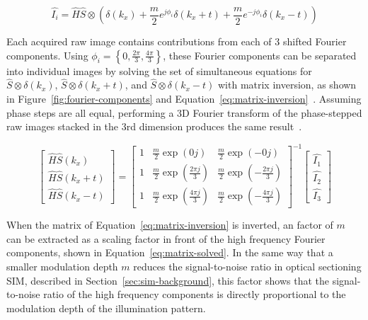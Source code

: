 \begin{equation} \label{eq:heintzmann-fourier}
\hat{I_i} = \hat{H} \hat{S} \otimes \left( \delta \left( k_x \right) + \frac{m}{2} e^{j\phi_i} \delta \left( k_x + t \right) + \frac{m}{2} e^{-j\phi_i} \delta \left( k_x - t \right) \right) 
\end{equation}

Each acquired raw image contains contributions from each of 3 shifted Fourier components. 
Using $\phi_i = \left\lbrace0, \frac{2\pi}{3}, \frac{4\pi}{3}\right\rbrace$, these Fourier components can be separated into individual images by solving the set of simultaneous equations for $\hat{S}\otimes\delta \left( k_x \right)$, $\hat{S}\otimes\delta \left( k_x + t \right)$, and $\hat{S}\otimes\delta \left( k_x - t \right)$ with matrix inversion, as shown in Figure~\ref{fig:fourier-components} and Equation~\ref{eq:matrix-inversion}~\cite{wicker2013phase}. 
Assuming phase steps are all equal, performing a 3D Fourier transform of the phase-stepped raw images stacked in the 3rd dimension produces the same result~\cite{gustafsson2005nonlinear}. 

\begin{equation} \label{eq:matrix-inversion}
\begin{bmatrix} \hat{H}\hat{S}\left(k_x\right) \\ \hat{H}\hat{S}\left(k_x+t\right) \\ \hat{H}\hat{S}\left(k_x-t\right) \end{bmatrix} = 
\begin{bmatrix}
1 & \frac{m}{2}\exp\left(0j\right) & \frac{m}{2}\exp\left(-0j\right) \\ 
1 & \frac{m}{2}\exp\left(\frac{2\pi j}{3}\right) & \frac{m}{2}\exp\left(-\frac{2\pi j}{3}\right) \\ 
1 & \frac{m}{2}\exp\left(\frac{4\pi j}{3}\right) & \frac{m}{2}\exp\left(-\frac{4\pi j}{3}\right)
\end{bmatrix}^{-1}
\begin{bmatrix} \hat{I_1} \\ \hat{I_2} \\ \hat{I_3} \end{bmatrix}
\end{equation}

When the matrix of Equation~\ref{eq:matrix-inversion} is inverted, an factor of $m$ can be extracted as a scaling factor in front of the high frequency Fourier components, shown in Equation~\ref{eq:matrix-solved}. 
In the same way that a smaller modulation depth $m$ reduces the signal-to-noise ratio in optical sectioning SIM, described in Section~\ref{sec:sim-background}, this factor shows that the signal-to-noise ratio of the high frequency components is directly proportional to the modulation depth of the illumination pattern. 

